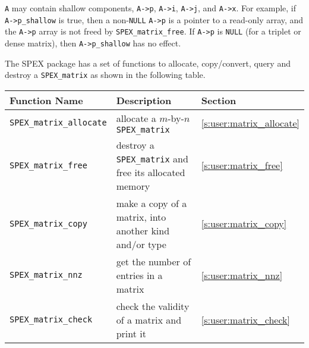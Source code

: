 \documentclass[12pt,oneside]{book}
\theoremstyle{definition}
\newenvironment{SizedCenteredTabular}[2][\small]
    {   
        #1\begin{center}\begin{tabular}{#2}
    }{ 
        \end{tabular}\end{center}
    }
\begin{document}
\verb|A| may contain shallow components, \verb|A->p|, \verb|A->i|, \verb|A->j|,
and \verb|A->x|.  For example, if \verb|A->p_shallow| is true, then a
non-\verb|NULL| \verb|A->p| is a pointer to a read-only array, and the
\verb|A->p| array is not freed by \verb|SPEX_matrix_free|.  If \verb|A->p| is
\verb|NULL| (for a triplet or dense matrix), then \verb|A->p_shallow| has no
effect.



%
%

The SPEX package has a set of functions to allocate, copy/convert, query and
destroy a  \verb|SPEX_matrix| as shown in the following table.

\begin{SizedCenteredTabular}{lp{2.5in}l} \hline
        Function Name & Description & Section \\ \hline
        \verb|SPEX_matrix_allocate|
            & allocate a $m$-by-$n$ \verb|SPEX_matrix|
            & \ref{s:user:matrix_allocate} \\ \hline
        \verb|SPEX_matrix_free|
            & destroy a \verb|SPEX_matrix| and free its allocated memory
            & \ref{s:user:matrix_free} \\ \hline
        \verb|SPEX_matrix_copy|
            & make a copy of a matrix, into another kind and/or type
            & \ref{s:user:matrix_copy} \\ \hline
        \verb|SPEX_matrix_nnz|
            & get the number of entries in a matrix
            & \ref{s:user:matrix_nnz} \\ \hline
        \verb|SPEX_matrix_check|
            & check the validity of a matrix and print it
            & \ref{s:user:matrix_check} \\ \hline
\end{SizedCenteredTabular}
\end{document}
